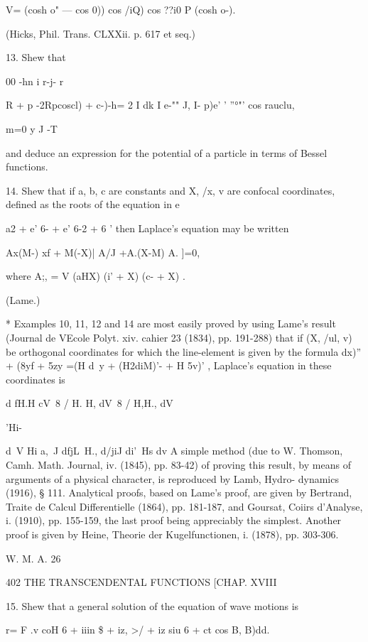 V= (cosh o" — cos 0))  cos /iQ) cos ??i0 P (cosh o-). 

(Hicks, Phil. Trans. CLXXii. p. 617 et seq.) 

13. Shew that 

00  -hn i r-j- r  

 R  + p -2Rpcoscl) + c-)-h= 2 I dk I e-"" J,   I- p)e' ' ''°"' cos rauclu, 

m=0   y J -T 

and deduce an expression for the potential of a particle in terms of Bessel functions. 

14. Shew that if a, b, c are constants and X, /x, v are confocal coordinates, defined as 
the roots of the equation in e 

a2 + e' 6-  + e'  6-2 + 6 ' 
then Laplace's equation may be written 

Ax(M-) xf  + M(-X)| A/J +A.(X-M)  A. ]=0, 

where A;, = V (aHX) (i'  + X) (c-  + X) . 

(Lame.) 

* Examples 10, 11, 12 and 14 are most easily proved by using Lame's result (Journal de 
VEcole Polyt. xiv. cahier 23 (1834), pp. 191-288) that if (X, /ul, v) be orthogonal coordinates for 
which the line-element is given by the formula  dx)'' + (8yf +  5zy =(H d\ y  + (H2diM)'- +  H 5v)' , 
Laplace's equation in these coordinates is 

d fH.H cV\ 8 / H. H, dV\ 8 / H,H., dV\ \   



'Hi- 



d\ V Hi a,\ J dfjL\ H., d/jiJ di'\ Hs dv 
A simple method (due to W. Thomson, Camh. Math. Journal, iv. (1845), pp. 83-42) of proving 
this result, by means of arguments of a physical character, is reproduced by Lamb, Hydro- 
dynamics (1916), § 111. Analytical proofs, based on Lame's proof, are given by Bertrand, 
Traite de Calcul Differentielle (1864), pp. 181-187, and Goursat, Coiirs d'Analyse, i. (1910), 
pp. 155-159, the last proof being appreciably the simplest. Another proof is given by Heine, 
Theorie der Kugelfunctionen, i. (1878), pp. 303-306. 

W. M. A. 26 



402 THE TRANSCENDENTAL FUNCTIONS [CHAP. XVIII 

15. Shew that a general solution of the equation of wave motions is 

r= F  .v coH 6 +   iiin \$ + iz, >/ + iz siu 6 + ct cos B, B)dd. 

